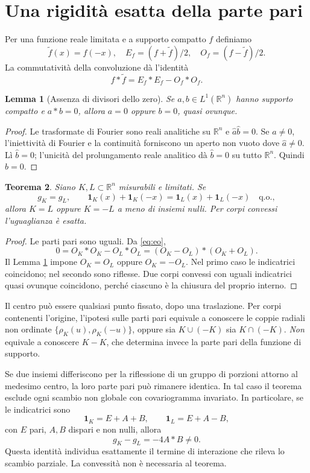 \documentclass[11pt,a4paper]{article}
\newtheorem{theorem}{Teorema}
\newtheorem{lemma}[theorem]{Lemma}
\theoremstyle{remark}
\newcommand{\R}{\mathbb R}
\newcommand{\ind}{\mathbf 1}
\begin{document}
\section{Una rigidità esatta della parte pari}
Per una funzione reale limitata e a supporto compatto $f$ definiamo
\[
\widetilde f(x)=f(-x),\quad E_f=(f+\widetilde f)/2,\quad
O_f=(f-\widetilde f)/2.
\]
La commutatività della convoluzione dà l'identità
\begin{equation}\label{eq:eo}
f*\widetilde f=E_f*E_f-O_f*O_f.
\end{equation}

\begin{lemma}[Assenza di divisori dello zero]\label{lem:zero}
Se $a,b\in L^1(\R^n)$ hanno supporto compatto e $a*b=0$, allora
$a=0$ oppure $b=0$, quasi ovunque.
\end{lemma}
\begin{proof}
Le trasformate di Fourier sono reali analitiche su $\R^n$ e
$\widehat a\widehat b=0$. Se $a\ne0$, l'iniettività di Fourier e la
continuità forniscono un aperto non vuoto dove $\widehat a\ne0$.
Lì $\widehat b=0$; l'unicità del prolungamento reale analitico dà
$\widehat b=0$ su tutto $\R^n$. Quindi $b=0$.
\end{proof}

\begin{theorem}\label{thm:even}
Siano $K,L\subset\R^n$ misurabili e limitati. Se
\[
g_K=g_L,\qquad
\ind_K(x)+\ind_K(-x)=\ind_L(x)+\ind_L(-x)\quad\text{q.o.},
\]
allora $K=L$ oppure $K=-L$ a meno di insiemi nulli.
Per corpi convessi l'uguaglianza è esatta.
\end{theorem}
\begin{proof}
Le parti pari sono uguali. Da \eqref{eq:eo},
\[
0=O_K*O_K-O_L*O_L=(O_K-O_L)*(O_K+O_L).
\]
Il Lemma \ref{lem:zero} impone $O_K=O_L$ oppure $O_K=-O_L$.
Nel primo caso le indicatrici coincidono; nel secondo sono riflesse.
Due corpi convessi con uguali indicatrici quasi ovunque coincidono, perché
ciascuno è la chiusura del proprio interno.
\end{proof}

Il centro può essere qualsiasi punto fissato, dopo una traslazione.
Per corpi contenenti l'origine, l'ipotesi sulle parti pari equivale a
conoscere le coppie radiali non ordinate
$\{\rho_K(u),\rho_K(-u)\}$, oppure sia $K\cup(-K)$ sia $K\cap(-K)$.
\emph{Non} equivale a conoscere $K-K$, che determina invece la parte pari
della funzione di supporto.

Se due insiemi differiscono per la riflessione di un gruppo di porzioni
attorno al medesimo centro, la loro parte pari può rimanere identica.
In tal caso il teorema esclude ogni scambio non globale con covariogramma
invariato. In particolare, se le indicatrici sono
\[
\ind_K=E+A+B,\qquad \ind_L=E+A-B,
\]
con $E$ pari, $A,B$ dispari e non nulli, allora
\begin{equation}\label{eq:cross}
g_K-g_L=-4A*B\ne0.
\end{equation}
Questa identità individua esattamente il termine di interazione che
rileva lo scambio parziale. La convessità non è necessaria al teorema.
\end{document}
